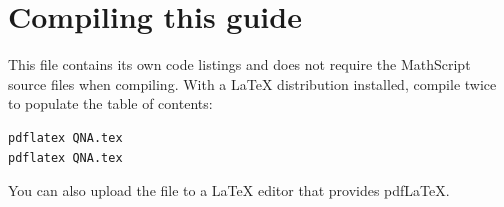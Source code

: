 \documentclass[11pt,a4paper]{report}
\begin{document}
\section*{Compiling this guide}
This file contains its own code listings and does not require the MathScript
source files when compiling. With a LaTeX distribution installed, compile
twice to populate the table of contents:
\begin{lstlisting}
pdflatex QNA.tex
pdflatex QNA.tex
\end{lstlisting}
You can also upload the file to a LaTeX editor that provides pdfLaTeX.
\end{document}
